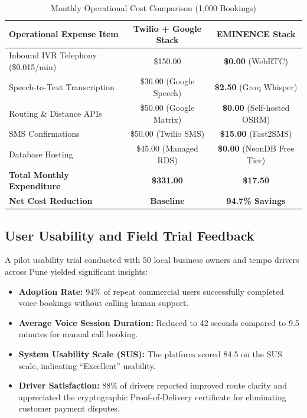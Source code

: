\documentclass[conference]{IEEEtran}
\begin{document}
\begin{table}[htbp]
\centering
\caption{Monthly Operational Cost Comparison (1,000 Bookings)}
\label{tab:cost_comparison}
\begin{tabular}{lcc}
\toprule
\textbf{Operational Expense Item} & \textbf{Twilio + Google Stack} & \textbf{EMINENCE Stack} \\
\midrule
Inbound IVR Telephony (\$0.015/min) & \$150.00 & \textbf{\$0.00} (WebRTC) \\
Speech-to-Text Transcription & \$36.00 (Google Speech) & \textbf{\$2.50} (Groq Whisper) \\
Routing \& Distance APIs & \$50.00 (Google Matrix) & \textbf{\$0.00} (Self-hosted OSRM) \\
SMS Confirmations & \$50.00 (Twilio SMS) & \textbf{\$15.00} (Fast2SMS) \\
Database Hosting & \$45.00 (Managed RDS) & \textbf{\$0.00} (NeonDB Free Tier) \\
\midrule
\textbf{Total Monthly Expenditure} & \textbf{\$331.00} & \textbf{\$17.50} \\
\textbf{Net Cost Reduction} & \textbf{Baseline} & \textbf{94.7\% Savings} \\
\bottomrule
\end{tabular}
\end{table}

\subsection{User Usability and Field Trial Feedback}
A pilot usability trial conducted with 50 local business owners and tempo drivers across Pune yielded significant insights:
\begin{itemize}
    \item \textbf{Adoption Rate:} 94\% of repeat commercial users successfully completed voice bookings without calling human support.
    \item \textbf{Average Voice Session Duration:} Reduced to 42 seconds compared to 9.5 minutes for manual call booking.
    \item \textbf{System Usability Scale (SUS):} The platform scored 84.5 on the SUS scale, indicating ``Excellent'' usability.
    \item \textbf{Driver Satisfaction:} 88\% of drivers reported improved route clarity and appreciated the cryptographic Proof-of-Delivery certificate for eliminating customer payment disputes.
\end{itemize}
\end{document}
